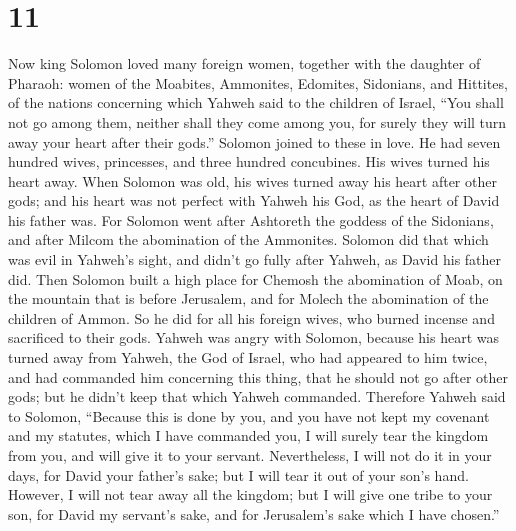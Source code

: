 \hypertarget{section-10}{%
\section{11}\label{section-10}}

 Now king Solomon loved many foreign women, together with
the daughter of Pharaoh: women of the Moabites, Ammonites, Edomites,
Sidonians, and Hittites,  of the nations concerning which
Yahweh said to the children of Israel, ``You shall not go among them,
neither shall they come among you, for surely they will turn away your
heart after their gods.'' Solomon joined to these in love.
 He had seven hundred wives, princesses, and three hundred
concubines. His wives turned his heart away.  When Solomon
was old, his wives turned away his heart after other gods; and his heart
was not perfect with Yahweh his God, as the heart of David his father
was.  For Solomon went after Ashtoreth the goddess of the
Sidonians, and after Milcom the abomination of the Ammonites.
 Solomon did that which was evil in Yahweh's sight, and
didn't go fully after Yahweh, as David his father did. 
Then Solomon built a high place for Chemosh the abomination of Moab, on
the mountain that is before Jerusalem, and for Molech the abomination of
the children of Ammon.  So he did for all his foreign
wives, who burned incense and sacrificed to their gods. 
Yahweh was angry with Solomon, because his heart was turned away from
Yahweh, the God of Israel, who had appeared to him twice,
 and had commanded him concerning this thing, that he
should not go after other gods; but he didn't keep that which Yahweh
commanded.  Therefore Yahweh said to Solomon, ``Because
this is done by you, and you have not kept my covenant and my statutes,
which I have commanded you, I will surely tear the kingdom from you, and
will give it to your servant.  Nevertheless, I will not
do it in your days, for David your father's sake; but I will tear it out
of your son's hand.  However, I will not tear away all
the kingdom; but I will give one tribe to your son, for David my
servant's sake, and for Jerusalem's sake which I have chosen.''

